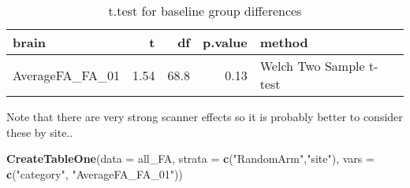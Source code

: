 \documentclass[]{article}
\newenvironment{Shaded}{\begin{snugshade}}{\end{snugshade}}
\newcommand{\KeywordTok}[1]{\textcolor[rgb]{0.13,0.29,0.53}{\textbf{#1}}}
\newcommand{\DataTypeTok}[1]{\textcolor[rgb]{0.13,0.29,0.53}{#1}}
\newcommand{\DecValTok}[1]{\textcolor[rgb]{0.00,0.00,0.81}{#1}}
\newcommand{\StringTok}[1]{\textcolor[rgb]{0.31,0.60,0.02}{#1}}
\newcommand{\OperatorTok}[1]{\textcolor[rgb]{0.81,0.36,0.00}{\textbf{#1}}}
\newcommand{\NormalTok}[1]{#1}
\theoremstyle{definition}
\theoremstyle{definition}
\theoremstyle{definition}
\theoremstyle{remark}
\begin{document}
\begin{Shaded}
\end{Shaded}

\begin{table}[t]

\caption{\label{tab:unnamed-chunk-9}t.test for baseline group differences}
\centering
\begin{tabular}{l|r|r|r|l}
\hline
brain & t & df & p.value & method\\
\hline
AverageFA\_FA\_01 & 1.54 & 68.8 & 0.13 & Welch Two Sample t-test\\
\hline
\end{tabular}
\end{table}

Note that there are very strong scanner effects so it is probably better
to consider these by site..

\begin{Shaded}
\begin{Highlighting}[]
\KeywordTok{CreateTableOne}\NormalTok{(}\DataTypeTok{data =}\NormalTok{ all_FA,}
               \DataTypeTok{strata =} \KeywordTok{c}\NormalTok{(}\StringTok{"RandomArm"}\NormalTok{,}\StringTok{"site"}\NormalTok{),}
               \DataTypeTok{vars =} \KeywordTok{c}\NormalTok{(}\StringTok{"category"}\NormalTok{, }\StringTok{"AverageFA_FA_01"}\NormalTok{))}
\end{Highlighting}
\end{Shaded}
\end{document}
